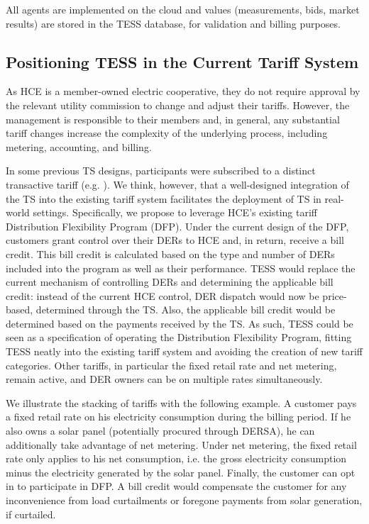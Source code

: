 All agents are implemented on the cloud and values (measurements, bids, market results) are stored in the TESS database, for validation and billing purposes.

\subsection{Positioning TESS in the Current Tariff System}\label{sec:position_tariff_system}

As HCE is a member-owned electric cooperative, they do not require approval by the relevant utility commission to change and adjust their tariffs. However, the management is responsible to their members and, in general, any substantial tariff changes increase the complexity of the underlying process, including metering, accounting, and billing. 

In some previous TS designs, participants were subscribed to a distinct transactive tariff (e.g. \citet{Widergren2014}).
We think, however, that a well-designed integration of the TS into the existing tariff system facilitates the deployment of TS in real-world settings. Specifically, we propose to leverage HCE's existing tariff Distribution Flexibility Program (DFP). Under the current design of the DFP, customers grant control over their DERs to HCE and, in return, receive a bill credit. This bill credit is calculated based on the type and number of DERs included into the program as well as their performance. TESS would replace the current mechanism of controlling DERs and determining the applicable bill credit: instead of the current HCE control, DER dispatch would now be price-based, determined through the TS. Also, the applicable bill credit would be determined based on the payments received by the TS. As such, TESS could be seen as a specification of operating the Distribution Flexibility Program, fitting TESS neatly into the existing tariff system and avoiding the creation of new tariff categories.
Other tariffs, in particular the fixed retail rate and net metering, remain active, and DER owners can be on multiple rates simultaneously. 

We illustrate the stacking of tariffs with the following example. A customer pays a fixed retail rate on his electricity consumption during the billing period. 
If he also owns a solar panel (potentially procured through DERSA), he can additionally take advantage of net metering. Under net metering, the fixed retail rate only applies to his net consumption, i.e. the gross electricity consumption minus the electricity generated by the solar panel. 
Finally, the customer can opt in to participate in DFP. A bill credit would compensate the customer for any inconvenience from load curtailments or foregone payments from solar generation, if curtailed.

